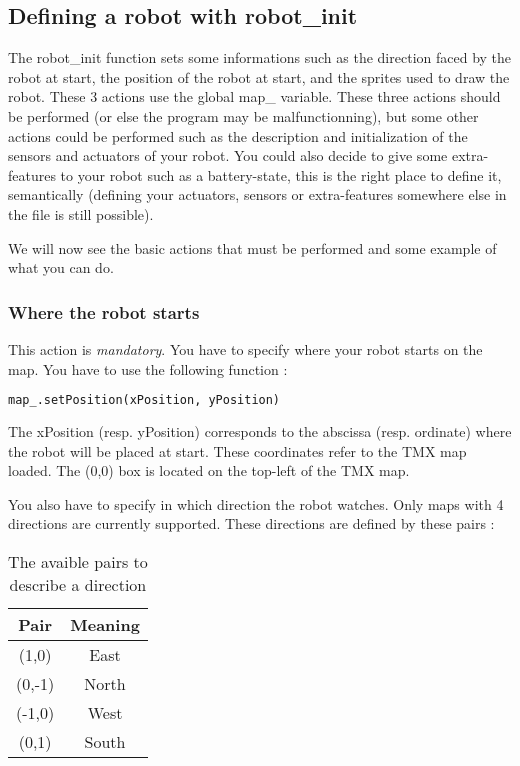 \documentclass[a4paper,11pt]{article}
\begin{document}
\subsection{Defining a robot with robot\_init}

The robot\_init function sets some informations such as the direction
faced by the robot at start, the position of the robot at start, and
the sprites used to draw the robot. These 3 actions use the global
map\_ variable. These three actions should be performed (or else the
program may be malfunctionning), but some other actions could be
performed such as the description and initialization of the sensors
and actuators of your robot. You could also decide to give some
extra-features to your robot such as a battery-state, this is the
right place to define it, semantically (defining your actuators,
sensors or extra-features somewhere else in the file is still
possible).

We will now see the basic actions that must be performed and some
example of what you can do.

\subsubsection{Where the robot starts}

This action is \emph{mandatory}. You have to specify where your robot
starts on the map. You have to use the following function :

\begin{lstlisting}[language=Python]
map_.setPosition(xPosition, yPosition)
\end{lstlisting}

The xPosition (resp. yPosition) corresponds to the abscissa
(resp. ordinate) where the robot will be placed at start. These
coordinates refer to the TMX map loaded. The (0,0) box is located on
the top-left of the TMX map.

You also have to specify in which direction the robot watches. Only
maps with 4 directions are currently supported. These directions are
defined by these pairs :


\begin{table}[h]
\begin{center}
\begin{tabular}{|c|c|}
  \hline
  Pair & Meaning \\
  \hline
  (1,0) & East \\
  (0,-1) & North \\
  (-1,0) & West \\
  (0,1) & South \\
  \hline
\end{tabular} 
\caption{\label{tab:Pypairs} The avaible pairs to describe a
  direction}
\end{center}
\end{table}
\end{document}
